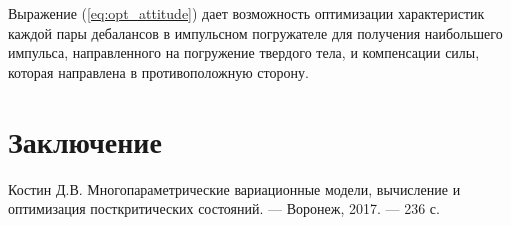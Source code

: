 Выражение (\ref{eq:opt_attitude}) дает возможность оптимизации характеристик каждой пары дебалансов в импульсном погружателе для получения наибольшего импульса, направленного на погружение твердого тела, и компенсации силы, которая направлена в противоположную сторону.


\clearpage
\section{Заключение}


\clearpage
{}
\begin{thebibliography}{}
    \bibitem{}\label{lit:kostin_disert}
    Костин Д.В. Многопараметрические вариационные модели, вычисление и оптимизация посткритических состояний. --- Воронеж, 2017. --- 236 с.
\end{thebibliography}
